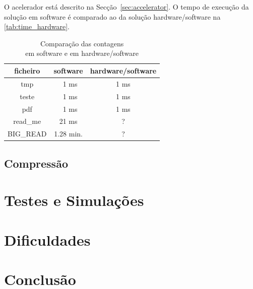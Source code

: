 \documentclass[a4paper]{article}
\begin{document}
	O acelerador está descrito na Secção~\ref{sec:accelerator}. O tempo de execução da solução em software é comparado ao da solução hardware/software na \autoref{tab:time_hardware}.


	\begin{table}[H]
		\centering
		\caption{Comparação das contagens \\em software e em hardware/software}

		\begin{tabular}{|c|c|c|}
			\hline
			ficheiro   & software   & hardware/software \\ \hline \hline
			tmp        & \ 1 ms     & 1 ms         \\ \hline
			teste      & \ 1 ms     & 1 ms         \\ \hline
			pdf        & \ 1 ms     & 1 ms         \\ \hline
			read\_me   & 21 ms      & ?          \\ \hline
			BIG\_READ  & 1.28 min.  & ?         \\
			\hline
		\end{tabular}
		\label{tab:time_hardware}
	\end{table}


	\subsection{Compressão}

	\section{Testes e Simulações}

	\section{Dificuldades}

	\section{Conclusão}

  \pagebreak

  \listoffigures
  \listoftables

\end{document}
